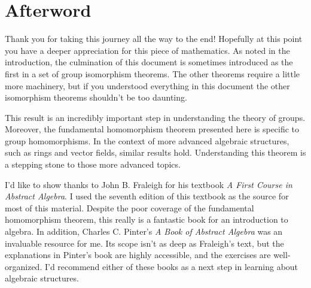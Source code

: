 \section*{Afterword}
\markright{}

Thank you for taking this journey all the way to the end! Hopefully at this point you have a deeper appreciation for this piece of mathematics. As noted in the introduction, the culmination of this document is sometimes introduced as the first in a set of group isomorphism theorems. The other theorems require a little more machinery, but if you understood everything in this document the other isomorphism theorems shouldn't be too daunting.

This result is an incredibly important step in understanding the theory of groups. Moreover, the fundamental homomorphism theorem presented here is specific to group homomorphisms. In the context of more advanced algebraic structures, such as rings and vector fields, similar results hold. Understanding this theorem is a stepping stone to those more advanced topics.

I'd like to show thanks to John B. Fraleigh for his textbook \textit{A First Course in Abstract Algebra}. I used the seventh edition of this textbook as the source for most of this material. Despite the poor coverage of the fundamental homomorphism theorem, this really is a fantastic book for an introduction to algebra. In addition, Charles C. Pinter's \textit{A Book of Abstract Algebra} was an invaluable resource for me. Its scope isn't as deep as Fraleigh's text, but the explanations in Pinter's book are highly accessible, and the exercises are well-organized. I'd recommend either of these books as a next step in learning about algebraic structures.